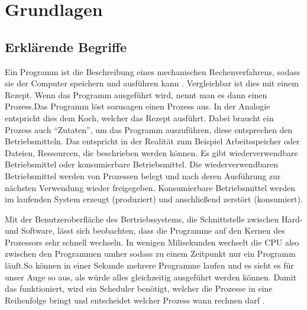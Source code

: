 \chapter{Grundlagen}
\label{grundlagen}
\section{Erklärende Begriffe}
Ein Programm ist die Beschreibung eines mechanischen Rechenverfahrens, sodass sie der Computer speichern und ausführen kann \parencite[vgl.][14]{rechenberg2000}. Vergleichbar ist dies mit einem Rezept. Wenn das Programm ausgeführt wird, nennt man es dann einen Prozess\parencite[vgl.][S.71]{tanenbaum2016}.Das Programm löst sozusagen einen Prozess aus. In der Analogie entspricht dies dem Koch, welcher das Rezept ausführt.  Dabei braucht ein Prozess auch “Zutaten”, um das Programm auszuführen, diese entsprechen den Betriebsmitteln. Das entspricht in der Realität zum Beispiel Arbeitsspeicher oder Dateien, Ressourcen, die beschrieben werden können. Es gibt wiederverwendbare Betriebsmittel oder konsumierbare Betriebsmittel. Die wiederverwendbaren Betriebsmittel werden von Prozessen belegt und nach deren Ausführung zur nächsten Verwendung  wieder freigegeben. Konsumierbare Betriebsmittel werden im laufenden System erzeugt (produziert) und anschließend zerstört (konsumiert).


Mit der Benutzeroberfläche des Bertriebssystems, die Schnittstelle zwischen Hard- und Software, lässt sich beobachten, dass die Programme auf den Kernen des Prozessors sehr schnell wechseln. In wenigen Milisekunden wechselt die CPU also zwischen den Programmen umher sodass zu einem Zeitpunkt nur ein Programm läuft.So können in einer Sekunde mehrere Programme laufen und es sieht es für unser Auge so aus, als würde alles gleichzeitig ausgeführt werden können. Damit  das funktioniert, wird ein Scheduler benötigt, welcher die Prozesse in eine Reihenfolge bringt und entscheidet welcher Prozess wann rechnen darf \parencite[vgl.][S.199]{tanenbaum2016}.

